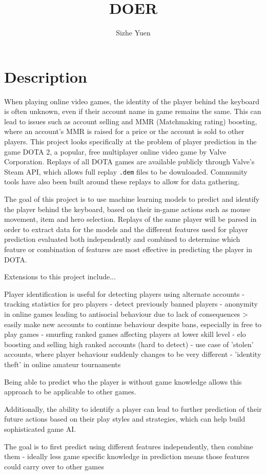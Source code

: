 \documentclass{sty/SizheArticle}
\title{DOER}
\author{Sizhe Yuen}
\begin{document}
\section{Description}
When playing online video games, the identity of the player behind the keyboard is often unknown, even if their account name in game remains the same. This can lead to issues such as account selling and MMR (Matchmaking rating) boosting, where an account's MMR is raised for a price or the account is sold to other players. This project looks specifically at the problem of player prediction in the game DOTA 2, a popular, free multiplayer online video game by Valve Corporation. Replays of all DOTA games are available publicly through Valve's Steam API, which allows full replay \texttt{.dem} files to be downloaded. Community tools have also been built around these replays to allow for data gathering. 

The goal of this project is to use machine learning models to predict and identify the player behind the keyboard, based on their in-game actions such as mouse movement, item and hero selection. Replays of the same player will be parsed in order to extract data for the models and the different features used for player prediction evaluated both independently and combined to determine which feature or combination of features are most effective in predicting the player in DOTA. 

Extensions to this project include...


Player identification is useful for detecting players using alternate accounts
- tracking statistics for pro players
- detect previously banned players
- anonymity in online games leading to antisocial behaviour due to lack of consequences > easily make new accounts to continue behaviour despite bans, especially in free to play games
- smurfing ranked games affecting players at lower skill level
- elo boosting and selling high ranked accounts (hard to detect)
- use case of 'stolen' accounts, where player behaviour suddenly changes to be very different
- 'identity theft' in online amateur tournaments

Being able to predict who the player is without game knowledge allows this approach to be applicable to other games.

Additionally, the ability to identify a player can lead to further prediction of their future actions based on their play styles and strategies, which can help build sophisticated game AI.

The goal is to first predict using different features independently, then combine them
- ideally less game specific knowledge in prediction means those features could carry over to other games
\end{document}
